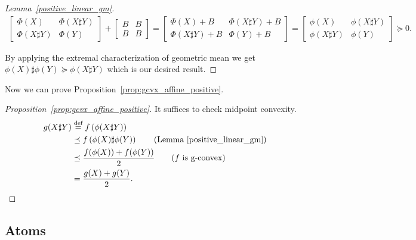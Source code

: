 \documentclass[twoside,11pt]{article}
\begin{document}
\begin{proof}[Lemma~\ref{positive_linear_gm}]
         \begin{equation}
        \begin{aligned}
\begin{bmatrix}
            \Phi(X)  & \Phi\left(X \sharp Y\right)  
            \\ \Phi\left(X\sharp Y\right)   &\Phi(Y) 
        \end{bmatrix} 
        + 
        \begin{bmatrix}
            B & B \\
            B & B
        \end{bmatrix}
        =
        \begin{bmatrix}
            \Phi(X)+ B &\Phi\left(X \sharp Y\right)   + B \\
            \Phi\left(X\sharp Y\right)+ B & \Phi(Y) + B
        \end{bmatrix}
        = \begin{bmatrix}
            \phi(X)  & \phi\left(X \sharp Y\right)  
            \\ \phi\left(X\sharp Y\right)   &\phi(Y) 
        \end{bmatrix} 
        \succeq 0 .
        \end{aligned}
    \end{equation}

 By applying the extremal characterization of geometric mean we get $\phi(X) \sharp \phi(Y) \succeq \phi(X \sharp Y)$ which is our desired result.
\end{proof}



Now we can prove Proposition~\ref{prop:gcvx_affine_positive}.

\begin{proof}[Proposition~\ref{prop:gcvx_affine_positive}]
    It suffices to check midpoint convexity. 
    \[
    \begin{aligned}
        g(X \sharp Y) &\stackrel{\text{def}}{=} f\left(\phi(X\sharp Y) \right) 
        \\& \preceq f \left( \phi(X)  \sharp \phi(Y) \right) \qquad (\text{Lemma~\ref{positive_linear_gm})}
        \\& \preceq \frac{f(\phi(X)) + f(\phi(Y))}{2} \qquad (f \text{ is g-convex})
        \\& = \frac{g(X) + g(Y)}{2}.
    \end{aligned}
    \]
\end{proof}


\subsection{Atoms}\label{app:gcvx_atoms}
\end{document}
